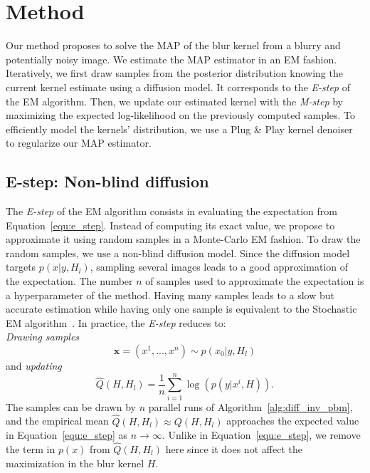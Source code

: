 \documentclass[10pt,twocolumn,letterpaper]{article}
\newcommand{\xb}{\ensuremath{\boldsymbol{x}}}
\begin{document}
\section{Method}
%
Our method proposes to solve the MAP of the blur kernel from a blurry and potentially noisy image. We estimate the MAP estimator in an EM fashion. Iteratively, we first draw samples from the posterior distribution knowing the current kernel estimate using a diffusion model. It corresponds to the \textit{E-step} of the EM algorithm. Then, we update our estimated kernel with the \textit{M-step} by maximizing the expected log-likelihood on the previously computed samples. To efficiently model the kernels' distribution, we use a Plug \& Play kernel denoiser to regularize our MAP estimator.
%
%
\subsection{E-step: Non-blind diffusion}
%
%
The \textit{E-step} of the EM algorithm consists in evaluating the expectation from Equation~\eqref{equ:e_step}. Instead of computing its exact value, we propose to approximate it using random samples in a Monte-Carlo EM fashion. To draw the random samples, we use a non-blind diffusion model. Since the diffusion model targets $p(x|y, H_l)$, sampling several images leads to a good approximation of the expectation. The number $n$ of samples used to approximate the expectation is a hyperparameter of the method. Having many samples leads to a slow but accurate estimation while having only one sample is equivalent to the Stochastic EM algorithm~\cite{nielson2000sEM}. In practice, the \textit{E-step} reduces to:\\
    \emph{Drawing samples}
    \begin{equation}\label{eq:Estep1}
    \xb = (x^1,...,x^n) \sim p(x_0|y,H_l)\end{equation}
    and \emph{updating}
    \begin{equation}\label{eq:Estep2}
    \widehat{Q}(H,H_l) = \frac{1}{n}\sum_{i=1}^n{\log(p(y|x^i,H))} .
    \end{equation}
%
The samples can be drawn by $n$ parallel runs of Algorithm~\ref{alg:diff_inv_pbm}, and the empirical mean $\widehat{Q}(H,H_l) \approx {Q}(H,H_l)$ approaches the expected value in Equation~\eqref{equ:e_step} as $n\to\infty$. Unlike in Equation~\eqref{equ:e_step}, we remove the term in $p(x)$ from $\widehat{Q}(H,H_l)$ here since it does not affect the maximization in the blur kernel $H$.
\end{document}
